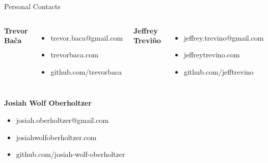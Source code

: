 \documentclass[10pt]{beamer}
\begin{document}
\begin{frame}{Personal Contacts}
    \begin{columns}[t,onlytextwidth]
        \textbf{Trevor Ba\v{c}a}
        \begin{itemize}
            \item trevor.baca@gmail.com
            \item trevorbaca.com
            \item github.com/trevorbaca
        \end{itemize}
        \textbf{Jeffrey Trevi\~{n}o}
        \begin{itemize}
            \item jeffrey.trevino@gmail.com
            \item jeffreytrevino.com
            \item github.com/jefftrevino
        \end{itemize}
    \end{columns}
    \vspace{\baselineskip}
    \textbf{Josiah Wolf Oberholtzer}
    \begin{itemize}
        \item josiah.oberholtzer@gmail.com
        \item josiahwolfoberholtzer.com
        \item github.com/josiah-wolf-oberholtzer
    \end{itemize}
\end{frame}
\end{document}
